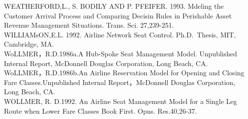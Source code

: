 WEATHERFORD,L., S. BODILY AND P. PFEIFER. 1993. Mdeling the Customer
Arrival Process and Comparing Decisin Rules in Perishable Asset Revenue
Management Situations. Trans. Sci. 27,239-251.\\
WILLIAMsON,E.L. 1992. Airline Network Seat Control. Ph.D.~Thesis, MIT,
Cambridge, MA.\\
WoLLMER，R.D.1986a.A Hub-Spoke Seat Management Model. Unpublished
Internal Report, McDonnell Douglas Corporation, Long Beach, CA.\\
WoLLMER，R.D.1986b.An Airline Reservation Model for Opening and Closing
Fare Classes.Unpublished Internal Report，McDonnell Douglas Corporation,
Long Beach, CA.\\
WOLLMER, R. D.1992. An Airline Seat Management Model for a Single Leg
Route when Lower Fare Classes Book First. Opns. Res.40,26-37.



